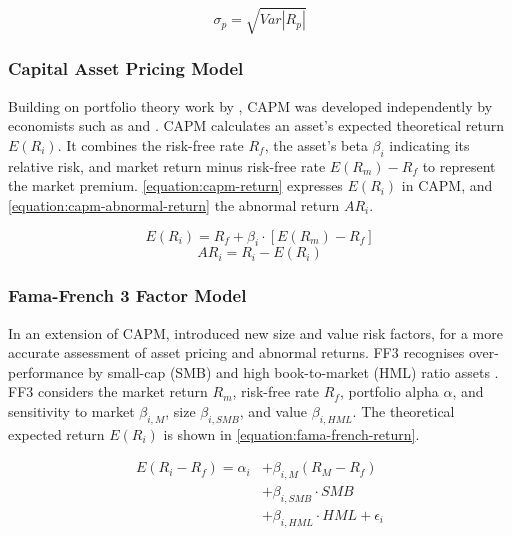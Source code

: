 \begin{equation}
\label{equation:markowitz-risk-and-return} 
    \sigma_p = \sqrt{Var|R_p|}
\end{equation}

\subsubsection{Capital Asset Pricing Model}

Building on portfolio theory work by \textcite{markowitz-portfolio-selection}, CAPM was developed independently by economists such as \textcite{sharpe-capital-asset-prices} and \textcite{mossin-equilibrium-in-a-capital-asset-market}. CAPM calculates an asset's expected theoretical return $E(R_i)$. It combines the risk-free rate $R_f$, the asset's beta $\beta_i$ indicating its relative risk, and market return minus risk-free rate $E(R_m) \minus R_f$ to represent the market premium. \autoref{equation:capm-return} expresses $E(R_i)$ in CAPM, and \autoref{equation:capm-abnormal-return} the abnormal return $AR_i$. 

\begin{equation}
\label{equation:capm-return}
    E(R_i)=R_f+\beta_i \cdot [E(R_m)-R_f]
\end{equation}
\begin{equation}
\label{equation:capm-abnormal-return}
    AR_i = R_i - E(R_i)
\end{equation}

\subsubsection{Fama-French 3 Factor Model}

In an extension of CAPM, \textcite{fama-french-common-risk-factors-in-the-returns-on-stocks-and-bonds} introduced new size and value risk factors, for a more accurate assessment of asset pricing and abnormal returns. FF3 recognises over-performance by small-cap (SMB) and high book-to-market (HML) ratio assets \parencite{fama-french-common-risk-factors-in-the-returns-on-stocks-and-bonds}. FF3 considers the market return $R_m$, risk-free rate $R_f$, portfolio alpha $\alpha$, and sensitivity to market $\beta_{i,M}$, size $\beta_{i,SMB}$, and value $\beta_{i,HML}$. The theoretical expected return $E(R_i)$ is shown in \autoref{equation:fama-french-return}.

\vspace{-1em}
\begin{equation}
\label{equation:fama-french-return}
\begin{split}
    E(R_i-R_f) = \alpha_i &+ \beta_{i,M} (R_M - R_f) \\ 
    &+ \beta_{i,SMB} \cdot SMB \\ 
    &+ \beta_{i,HML} \cdot HML + \epsilon_i 
\end{split}
\end{equation}

